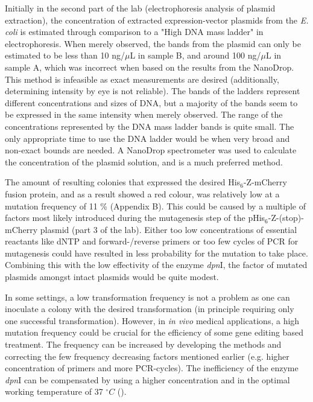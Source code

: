 \documentclass[11pt,a4paper]{article}
\begin{document}
Initially in the second part of the lab (electrophoresis analysis of plasmid extraction), the concentration of extracted expression-vector plasmids from the \textit{E. coli} is estimated through comparison to a "High DNA mass ladder" in electrophoresis. When merely observed, the bands from the plasmid can only be estimated to be less than 10 ng/$\mu$L in sample B, and around 100 ng/$\mu$L in sample A, which was incorrect when based on the results from the NanoDrop. This method is infeasible as exact measurements are desired (additionally, determining intensity by eye is not reliable). The bands of the ladders represent different concentrations and sizes of DNA, but a majority of the bands seem to be expressed in the same intensity when merely observed. The range of the concentrations represented by the DNA mass ladder bands is quite small. The only appropriate time to use the DNA ladder would be when very broad and non-exact bounds are needed. A NanoDrop spectrometer was used to calculate the concentration of the plasmid solution, and is a much preferred method. 

The amount of resulting colonies that expressed the desired His$_6$-Z-mCherry fusion protein, and as a result showed a red colour, was relatively low at a mutation frequency of 11 \% (Appendix B). This could be caused by a multiple of factors most likely introduced during the mutagenesis step of the pHis$_6$-Z-(stop)-mCherry plasmid (part 3 of the lab). Either too low concentrations of essential reactants like dNTP and forward-/reverse primers or too few cycles of PCR for mutagenesis could have resulted in less probability for the mutation to take place. Combining this with the low effectivity of the enzyme \textit{dpn}I, the factor of mutated plasmids amongst intact plasmids would be quite modest. 

In some settings, a low transformation frequency is not a problem as one can inoculate a colony with the desired transformation (in principle requiring only one successful transformation). However, in \textit{in vivo} medical applications, a high mutation frequency could be crucial for the efficiency of some gene editing based treatment. The frequency can be increased by developing the methods and correcting the few frequency decreasing factors mentioned earlier (e.g. higher concentration of primers and more PCR-cycles). The inefficiency of the enzyme \textit{dpn}I can be compensated by using a higher concentration and in the optimal working temperature of 37 $^\circ C$ (\cite{TF}). 
\end{document}
